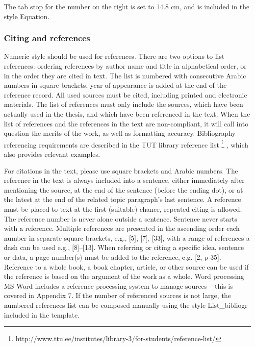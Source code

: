 The tab stop for the number on the right is set to 14.8 cm, and is included in the style
Equation.


\subsubsection{Citing and references}

Numeric style should be used for references. There are two options to
list references: ordering references by author name and title in
alphabetical order, or in the order they are cited in text. The list
is numbered with consecutive Arabic numbers in square brackets, year
of appearance is added at the end of the reference record. All used
sources must be cited, including printed and electronic materials. The
list of references must only include the sources, which have been
actually used in the thesis, and which have been referenced in the
text. When the list of references and the references in the text are
non-compliant, it will call into question the merits of the work, as
well as formatting accuracy. Bibliography referencing requirements are
described in the TUT library reference list
\footnote{http://www.ttu.ee/institutes/library-3/for-students/reference-list/}
, which also provides relevant examples.

For citations in the text, please use square brackets and Arabic
numbers. The reference in the text is always included into a sentence,
either immediately after mentioning the source, at the end of the
sentence (before the ending dot), or at the latest at the end of the
related topic paragraph’s last sentence. A reference must be placed to
text at the first (suitable) chance, repeated citing is allowed. The
reference number is never alone outside a sentence. Sentence never
starts with a reference. Multiple references are presented in the
ascending order each number in separate square brackets, e.g., [5],
[7], [33], with a range of references a dash can be used e.g.,
[8]–[13]. When referring or citing a specific idea, sentence or data,
a page number(s) must be added to the reference, e.g. [2, p
35]. Reference to a whole book, a book chapter, article, or other
source can be used if the reference is based on the argument of the
work as a whole.
Word processing MS Word includes a reference processing system to
manage sources -- this is covered in Appendix 7.
If the number of referenced sources is not large, the numbered
references list can be composed manually using the style
List\_bibliogr included in the template.

